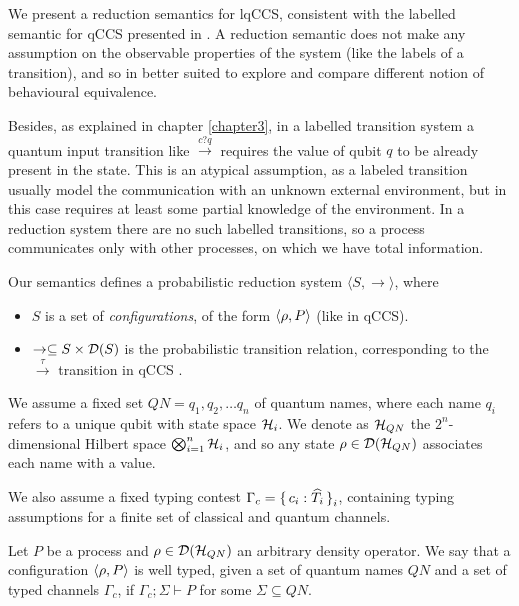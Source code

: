 We present a reduction semantics for lqCCS, consistent with the labelled semantic for qCCS presented in \cite{fengBisimulationQuantumProcesses2012, dengOpenBisimulationQuantum2012}. A reduction semantic does not make any assumption on the observable properties of the system (like the labels of a transition), and so in better suited to explore and compare different notion of behavioural equivalence.

Besides, as explained in chapter \ref{chapter3}, in a labelled transition system a quantum input transition like $\xrightarrow{c?q}$ requires the value of qubit $q$ to be already present in the state. This is an atypical assumption, as a labeled transition usually model the communication with an unknown external environment, but in this case requires at least some partial knowledge of the environment. In a reduction system there are no such labelled transitions, so a process communicates only with other processes, on which we have total information.

Our semantics defines a probabilistic reduction system $\langle S, \rightarrow \rangle$, where \begin{itemize}
\item $S$ is a set of \textit{configurations}, of the form $\langle\rho, P\rangle$ (like in qCCS).
\item $\rightarrow \subseteq S \times \mathcal{D}(S)$ is the probabilistic transition relation, corresponding to the $\xrightarrow{\tau}$ transition in qCCS \cite{fengBisimulationQuantumProcesses2012, dengOpenBisimulationQuantum2012}.
\end{itemize}

We assume a fixed set  $QN = {q_1, q_2, \ldots q_n}$ of quantum names, where each name $q_i$ refers to a unique qubit with state space $\mathcal{H}_i$. We denote as $\mathcal{H}_{QN}$ the $2^n$-dimensional Hilbert space $\bigotimes_{i=1}^n \mathcal{H}_i$, and so any state 
$\rho \in \mathcal{D}(\mathcal{H}_{QN})$ associates each name with a value.

We also assume a fixed typing contest $\Gamma_c = \set{c_i: \widehat{T_i}}_i$, containing typing assumptions for a finite set of classical and quantum channels.

\begin{definition}
Let $P$ be a process and $\rho \in \mathcal{D}(\mathcal{H}_{QN})$ an arbitrary density operator. We say that a configuration $\langle\rho, P\rangle$ is well typed, given a set of quantum names $QN$ and a set of typed channels $\Gamma_c$, if $\Gamma_c; \Sigma \vdash P$ for some $\Sigma \subseteq QN$.

\end{definition}

